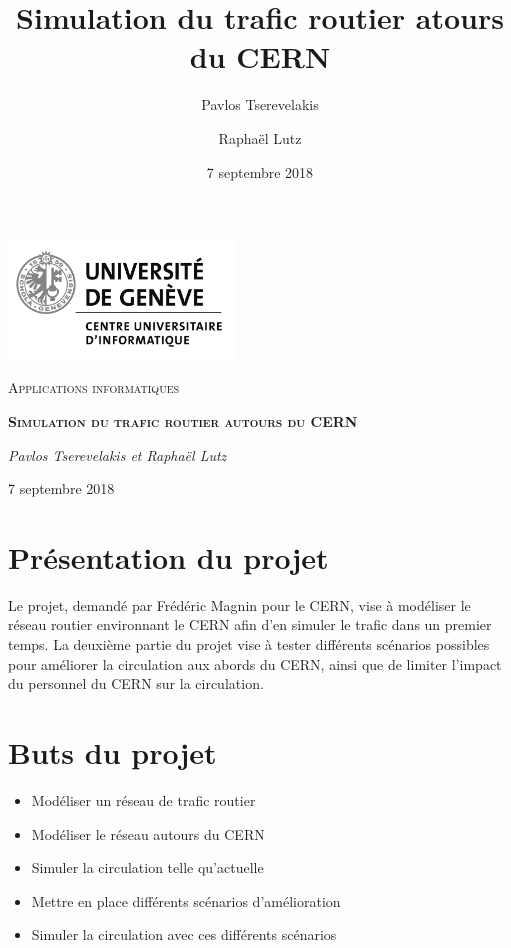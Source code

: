 \documentclass[a4paper,11pt, titlepage]{extarticle}
\title{Simulation du trafic routier atours du CERN}
\author{Pavlos Tserevelakis \and Raphaël Lutz}
\date{7 septembre 2018}
\begin{document}
\begin{titlepage}
	\centering
	\includegraphics[width=0.45\textwidth]{logoUni.jpg}\par
	\vspace{3cm}
	{\scshape\Large Applications informatiques \par}
	\vspace{1.5cm}
	{\scshape\huge\bfseries Simulation du trafic routier autours du CERN\par}
	\vspace{1.5cm}
	{\Large\itshape Pavlos Tserevelakis et Raphaël Lutz\par}
	\vspace{1.5cm}
	{ 7 septembre 2018\par}
	\vfill
\end{titlepage}


\tableofcontents\newpage

\pagestyle{fancy}
\renewcommand{\headheight}{24pt}
\rhead{\today}

\section{Présentation du projet}

Le projet, demandé par Frédéric Magnin pour le CERN, vise à modéliser le réseau routier environnant le CERN afin d'en simuler le trafic dans un premier temps. La deuxième partie du projet vise à tester différents scénarios possibles pour améliorer la circulation aux abords du CERN, ainsi que de limiter l'impact du personnel du CERN sur la circulation.

\section{Buts du projet}

\begin{itemize}
\item Modéliser un réseau de trafic routier
\item Modéliser le réseau autours du CERN
\item Simuler la circulation telle qu'actuelle
\item Mettre en place différents scénarios d'amélioration
\item Simuler la circulation avec ces différents scénarios
\end{itemize}
\end{document}
